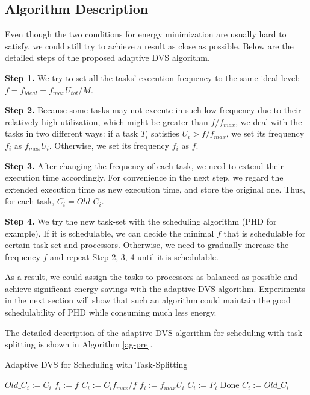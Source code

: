 \documentclass[12pt, journal,compsoc]{IEEEtran}
\begin{document}
\subsection{Algorithm Description}

Even though the two conditions for energy minimization are usually hard to satisfy, we could still try to achieve a result as close as possible. Below are the detailed steps of the proposed adaptive DVS algorithm.

\textbf{Step 1.} We try to set all the tasks' execution frequency to the same ideal level: $f = f_{ideal} = f_{max} U_{tot}/M$.

\textbf{Step 2.} Because some tasks may not execute in such low frequency due to their relatively high utilization, which might be greater than $f/f_{max}$, we deal with the tasks in two different ways: if a task $T_i$ satisfies $U_i > f/f_{max}$, we set its frequency $f_i$ as $f_{max} U_i$. Otherwise, we set its frequency $f_i$ as $f$.

\textbf{Step 3.} After changing the frequency of each task, we need to extend their execution time accordingly. For convenience in the next step, we regard the extended execution time as new execution time, and store the original one. Thus, for each task, $C_i = Old\_C_i$.

\textbf{Step 4.} We try the new task-set with the scheduling algorithm (PHD for example). If it is schedulable, we can decide the minimal $f$ that is schedulable for certain task-set and processors. Otherwise, we need to gradually increase the frequency $f$ and repeat Step 2, 3, 4 until it is schedulable.

As a result, we could assign the tasks to processors as balanced as possible and achieve significant energy savings with the adaptive DVS algorithm. Experiments in the next section will show that such an algorithm could maintain the good schedulability of PHD while consuming much less energy.

The detailed description of the adaptive DVS algorithm for scheduling with task-splitting is shown in Algorithm \ref{ag-pre}.

\begin{algorithm}
\caption{Adaptive DVS for Scheduling with Task-Splitting}
\label{ag-pre}
\begin{algorithmic}[1]
\STATE $Old\_C_i:=C_i$
\ENDFOR
{}
\STATE $f_i:=f$
\STATE $C_i:=C_i f_{max}/f$
\ELSE
\STATE $f_i:=f_{max} U_i$
\STATE $C_i:=P_i$
\ENDIF
\ENDFOR
{}
\STATE Done
\ELSE
{}
\STATE $C_i:=Old\_C_i$
\ENDFOR
\ENDIF
\ENDFOR
\end{algorithmic}
\end{algorithm}
\end{document}
